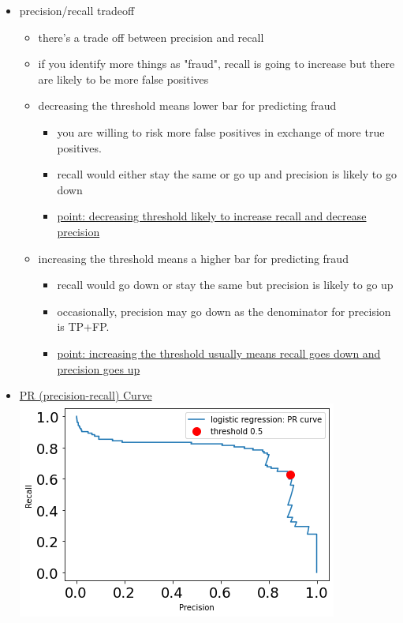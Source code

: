 \documentclass[10.5pt,a4paper, fleqn, dvipsnames]{article}
\begin{document}
\begin{itemize}
\begin{itemize}
    \end{itemize}
    \newpage
    \item precision/recall tradeoff
    \begin{itemize}
        \item there's a trade off between precision and recall
        \item if you identify more things as "fraud", recall is going to increase but there are likely to be more false positives 
        \item decreasing the threshold means lower bar for predicting fraud
        \begin{itemize}
            \item you are willing to risk more false positives in exchange of more true positives.
            \item recall would either stay the same or go up and precision is likely to go down
            \item \ul{point: decreasing threshold likely to increase recall and decrease precision}
        \end{itemize}
        \item increasing the threshold means a higher bar for predicting fraud
        \begin{itemize}
            \item recall would go down or stay the same but precision is likely to go up
            \item occasionally, precision may go down as the denominator for precision is TP+FP.
            \item \ul{point: increasing the threshold usually means recall goes down and precision goes up}
        \end{itemize}
    \end{itemize}
    \item \ul{PR (precision-recall) Curve} \\
    \includegraphics[scale = 0.65]{pr-curve.png}

\end{itemize}
\end{document}
